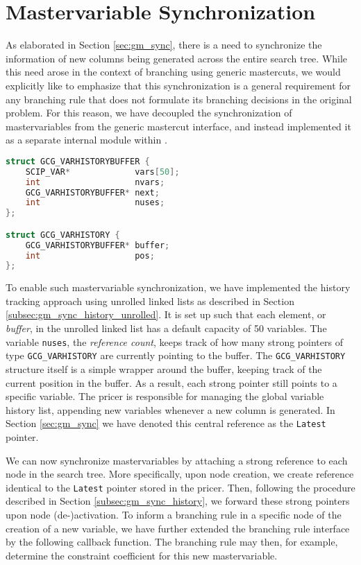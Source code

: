 \section{Mastervariable Synchronization}\label{sec:implementation_sync}
As elaborated in Section \ref{sec:gm_sync}, there is a need to synchronize the information of new columns being generated across the entire search tree. While this need arose in the context of branching using generic mastercuts, we would explicitly like to emphasize that this synchronization is a general requirement for any branching rule that does not formulate its branching decisions in the original problem. For this reason, we have decoupled the synchronization of mastervariables from the generic mastercut interface, and instead implemented it as a separate internal module within \GCG{}.

\begin{lstlisting}[language=C, caption=Variable History Construct]
struct GCG_VARHISTORYBUFFER {
	SCIP_VAR*             vars[50];
	int                   nvars;
	GCG_VARHISTORYBUFFER* next;
	int                   nuses;
};

struct GCG_VARHISTORY {
	GCG_VARHISTORYBUFFER* buffer;
	int                   pos;
};
\end{lstlisting}

To enable such mastervariable synchronization, we have implemented the history tracking approach using unrolled linked lists as described in Section \ref{subsec:gm_sync_history_unrolled}. It is set up such that each element, or \textit{buffer}, in the unrolled linked list has a default capacity of 50 variables. The variable \texttt{nuses}, the \textit{reference count}, keeps track of how many strong pointers of type \texttt{GCG\_VARHISTORY} are currently pointing to the buffer. The \texttt{GCG\_VARHISTORY} structure itself is a simple wrapper around the buffer, keeping track of the current position in the buffer. As a result, each strong pointer still points to a specific variable. The \GCG{} pricer is responsible for managing the global variable history list, appending new variables whenever a new column is generated. In Section \ref{sec:gm_sync} we have denoted this central reference as the \texttt{Latest} pointer.

We can now synchronize mastervariables by attaching a strong reference to each node in the search tree. More specifically, upon node creation, we create reference identical to the \texttt{Latest} pointer stored in the \GCG{} pricer. Then, following the procedure described in Section \ref{subsec:gm_sync_history}, we forward these strong pointers upon node (de-)activation. To inform a branching rule in a specific node of the creation of a new variable, we have further extended the \GCG{} branching rule interface by the following callback function. The branching rule may then, for example, determine the constraint coefficient for this new mastervariable.

